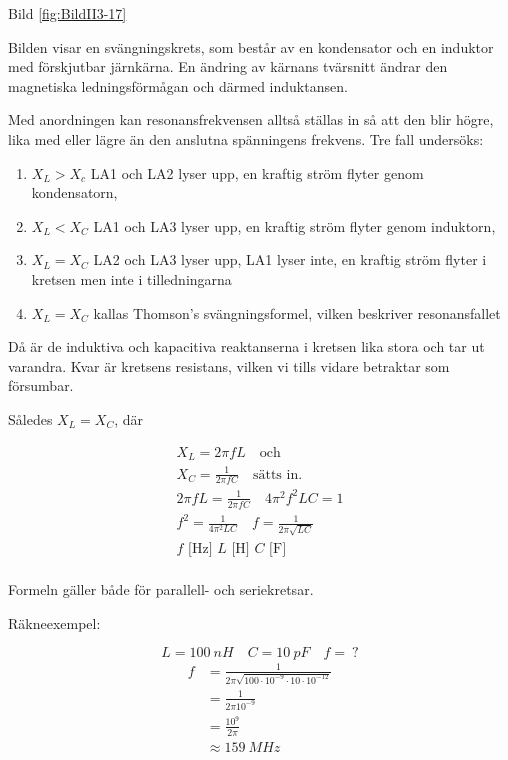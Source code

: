 Bild \ref{fig:BildII3-17}

Bilden visar en svängningskrets, som består av en kondensator och en induktor
med förskjutbar järnkärna. En ändring av kärnans tvärsnitt ändrar den
magnetiska ledningsförmågan och därmed induktansen.

Med anordningen kan resonansfrekvensen alltså ställas in så att den blir högre,
lika med eller lägre än den anslutna spänningens frekvens. Tre fall undersöks:
\begin{enumerate}
\item \(X_L > X_c\) LA1 och LA2 lyser upp, en kraftig ström flyter genom
  kondensatorn,
\item \(X_L < X_C\) LA1 och LA3 lyser upp, en kraftig ström flyter genom
  induktorn,
\item \(X_L= X_C\) LA2 och LA3 lyser upp, LA1 lyser inte, en kraftig ström
  flyter i kretsen men inte i tilledningarna
\item \(X_L = X_C\) kallas Thomson's svängningsformel, vilken beskriver
  resonansfallet
\end{enumerate}

Då är de induktiva och kapacitiva reaktanserna i kretsen lika stora och tar ut
varandra. Kvar är kretsens resistans, vilken vi tills vidare betraktar som
försumbar.

Således \(X_L = X_C\), där

\begin{gather*}
  X_L = 2πfL \quad \text{och} \\
  X_C = \frac{1}{2πfC} \quad \text{sätts in.} \\
  2πfL = \frac{1}{2πfC} \quad 4π^2f^2LC = 1 \\
  f^2 = \frac{1}{4π^2LC} \quad f = \frac{1}{2π\sqrt{LC}} \\
  f\text{ [Hz] }L\text{ [H] }C\text{ [F] } \\
\end{gather*}

Formeln gäller både för parallell- och seriekretsar.

Räkneexempel:

\[L = 100\ nH \quad C = 10\ pF \quad f =\ ?\]
\begin{align*}
  f &= \frac{1}{2π\sqrt{100 \cdot 10^{-9} \cdot 10 \cdot 10^{-12}}} \\
  &= \frac{1}{2π10^{-9}} \\
  &= \frac{10^9}{2π} \\
  &\approx 159\ MHz
\end{align*}

